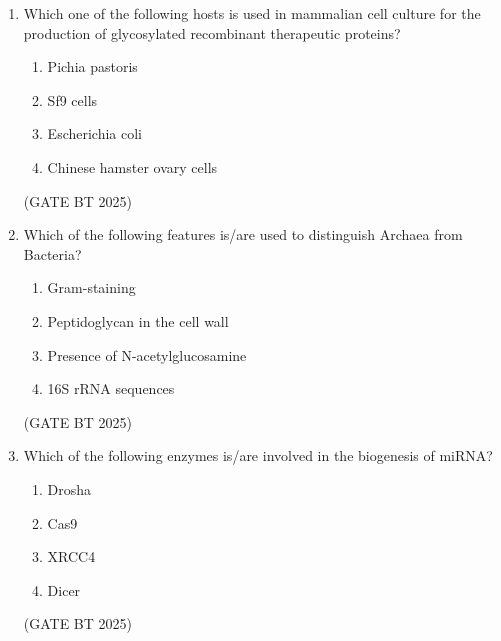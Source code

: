 \documentclass[journal,12pt,onecolumn]{IEEEtran}
\theoremstyle{remark}
\begin{document}
\begin{enumerate}
\begin{enumerate}
    \item P-1; Q-5; R-3; S-2
    \item P-3; Q-4; R-5; S-2
    \item P-3; Q-2; R-1; S-5
    \item P-3; Q-4; R-1; S-2
\end{enumerate}  
\hfill (GATE BT 2025)

\item Which one of the following hosts is used in mammalian cell culture for the production of glycosylated recombinant therapeutic proteins?  
\begin{multicols}{2}
\begin{enumerate}
    \item Pichia pastoris
    \item Sf9 cells
    \item Escherichia coli
    \item Chinese hamster ovary cells
\end{enumerate}  
\end{multicols}
\hfill (GATE BT 2025)

\item Which of the following features is/are used to distinguish Archaea from Bacteria?  
\begin{multicols}{2}
\begin{enumerate}
    \item Gram-staining
    \item Peptidoglycan in the cell wall
    \item Presence of N-acetylglucosamine
    \item 16S rRNA sequences
\end{enumerate}  
\end{multicols}
\hfill (GATE BT 2025)

\item Which of the following enzymes is/are involved in the biogenesis of miRNA?  
\begin{multicols}{2}
\begin{enumerate}
    \item Drosha
    \item Cas9
    \item XRCC4
    \item Dicer
\end{enumerate}  
\end{multicols}
\hfill (GATE BT 2025)


\end{enumerate}
\end{document}
